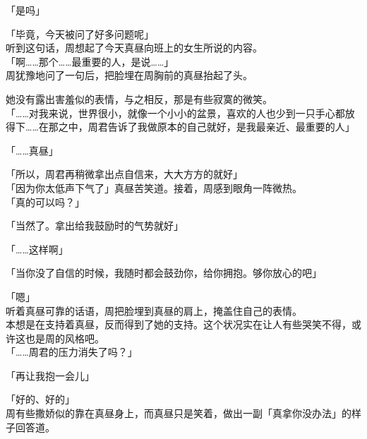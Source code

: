 「是吗」

「毕竟，今天被问了好多问题呢」\\

听到这句话，周想起了今天真昼向班上的女生所说的内容。\\

「啊……那个……最重要的人，是说……」\\

周犹豫地问了一句后，把脸埋在周胸前的真昼抬起了头。

她没有露出害羞似的表情，与之相反，那是有些寂寞的微笑。\\

「……对我来说，世界很小，就像一个小小的盆景，喜欢的人也少到一只手心都放得下……在那之中，周君告诉了我做原本的自己就好，是我最亲近、最重要的人」

「……真昼」

「所以，周君再稍微拿出点自信来，大大方方的就好」\\

「因为你太低声下气了」真昼苦笑道。接着，周感到眼角一阵微热。\\

「真的可以吗？」

「当然了。拿出给我鼓励时的气势就好」

「……这样啊」

「当你没了自信的时候，我随时都会鼓劲你，给你拥抱。够你放心的吧」

「嗯」\\

听着真昼可靠的话语，周把脸埋到真昼的肩上，掩盖住自己的表情。\\

本想是在支持着真昼，反而得到了她的支持。这个状况实在让人有些哭笑不得，或许这也是周的风格吧。\\

「……周君的压力消失了吗？」

「再让我抱一会儿」

「好的、好的」\\

周有些撒娇似的靠在真昼身上，而真昼只是笑着，做出一副「真拿你没办法」的样子回答道。
